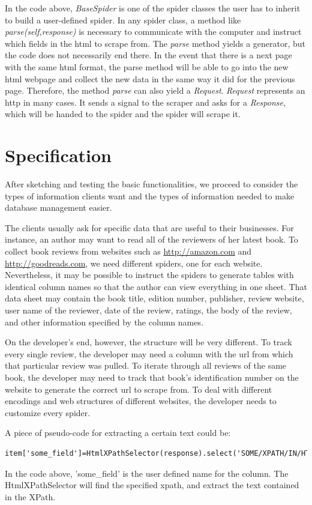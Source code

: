 \documentclass[12pt]{report}
\begin{document}
In the code above, \textit{BaseSpider} is one of the spider classes the user has to inherit to build a user-defined spider. In any spider class, a method like \textit{parse(self,response)} is necessary to communicate with the computer and instruct which fields in the html to scrape from. The \textit{parse} method yields a generator, but the code does not necessarily end there. In the event that there is a next page with the same html format, the parse method will be able to go into the new html webpage and collect the new data in the same way it did for the previous page. Therefore, the method \textit{parse} can also yield a \textit{Request}. \textit{Request} represents an \gls{http} in many cases. It sends a signal to the scraper and asks for a \textit{Response}, which will be handed to the spider and the spider will scrape it.

\section{Specification}

After sketching and testing the basic functionalities, we proceed to consider the types of information clients want and the types of information needed to make database management easier. 

The clients usually ask for specific data that are useful to their businesses. For instance, an author may want to read all of the reviewers of her latest book. To collect book reviews from websites such as \url{http://amazon.com} and \url{http://goodreads.com}, we need different spiders, one for each website. Nevertheless, it may be possible to instruct the spiders to generate tables with identical column names so that the author can view everything in one sheet. That data sheet may contain the book title, edition number, publisher, review website, user name of the reviewer, date of the review, ratings, the body of the review, and other information specified by the column names.

On the developer's end, however, the structure will be very different. To track every single review, the developer may need a column with the url from which that particular review was pulled. To iterate through all reviews of the same book, the developer may need to track that book's identification number on the website to generate the correct url to scrape from. To deal with different encodings and web structures of different websites, the developer needs to customize every spider.

A piece of pseudo-code for extracting a certain text could be:
\begin{lstlisting}
item['some_field']=HtmlXPathSelector(response).select('SOME/XPATH/IN/HTML/text()').extract()
\end{lstlisting}
In the code above, 'some\_field' is the user defined name for the column. The HtmlXPathSelector will find the specified \gls{xpath}, and extract the text contained in the XPath.
\end{document}
